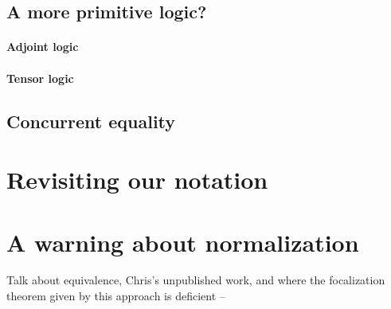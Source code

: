 \subsection{A more primitive logic?}
\label{sec:moreprim}

\paragraph{Adjoint logic}

\paragraph{Tensor logic}

\subsection{Concurrent equality}

\section{Revisiting our notation}
\label{sec:linnote}

\section{A warning about normalization}
\label{sec:warning}

Talk about equivalence, Chris's unpublished work, and where
the focalization theorem given by this approach is deficient -- 